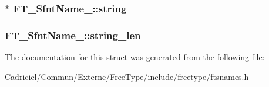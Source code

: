 \hypertarget{struct_f_t___sfnt_name___ab369e2c3d8dc9662f69c53e4d3158067}{
\subsubsection[{string}]{$\ast$ F\-T\-\_\-\-Sfnt\-Name\-\_\-\-::string}}\label{struct_f_t___sfnt_name___ab369e2c3d8dc9662f69c53e4d3158067}
\hypertarget{struct_f_t___sfnt_name___a4ebdb7207b5681d16f9cc17f432cb56f}{
\subsubsection[{string\-\_\-len}]{ F\-T\-\_\-\-Sfnt\-Name\-\_\-\-::string\-\_\-len}}\label{struct_f_t___sfnt_name___a4ebdb7207b5681d16f9cc17f432cb56f}


The documentation for this struct was generated from the following file\-:\begin{DoxyCompactItemize}
\item 
Cadriciel/\-Commun/\-Externe/\-Free\-Type/include/freetype/\hyperlink{ftsnames_8h}{ftsnames.\-h}\end{DoxyCompactItemize}
